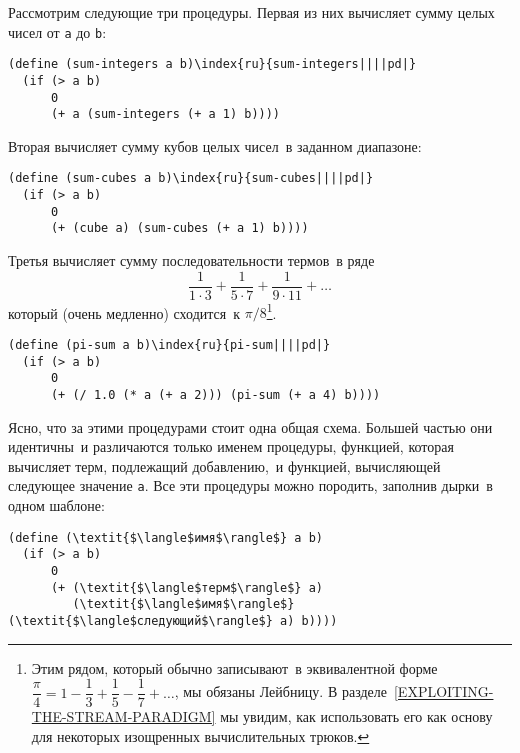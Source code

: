 Рассмотрим
следующие три процедуры.  Первая из них 
вычисляет сумму целых чисел от {\tt a} до {\tt b}:

\begin{Verbatim}[fontsize=\small]
(define (sum-integers a b)\index{ru}{sum-integers||||pd|}
  (if (> a b)
      0
      (+ a (sum-integers (+ a 1) b))))
\end{Verbatim}
Вторая вычисляет сумму кубов целых чисел~в заданном диапазоне:

\begin{Verbatim}[fontsize=\small]
(define (sum-cubes a b)\index{ru}{sum-cubes||||pd|}
  (if (> a b)
      0
      (+ (cube a) (sum-cubes (+ a 1) b))))
\end{Verbatim}
Третья вычисляет сумму последовательности термов~в ряде
$$
\dfrac{1}{1 \cdot 3} + \dfrac{1}{5 \cdot 7} + \dfrac{1}{9 \cdot 11} + \ldots
$$
который (очень медленно) сходится~к $\pi / 8$\footnote{
Этим рядом, который обычно записывают~в эквивалентной форме
$\dfrac{\pi}{4} = 1 - \dfrac{1}{3} + \dfrac{1}{5} - \dfrac{1}{7} +
\ldots$, мы обязаны  Лейбницу.
В разделе~\ref{EXPLOITING-THE-STREAM-PARADIGM} мы увидим,
как использовать его как основу для некоторых изощренных
вычислительных трюков.}.

\begin{Verbatim}[fontsize=\small]
(define (pi-sum a b)\index{ru}{pi-sum||||pd|}
  (if (> a b)
      0
      (+ (/ 1.0 (* a (+ a 2))) (pi-sum (+ a 4) b))))
\end{Verbatim}
Ясно, что за этими процедурами стоит одна общая схема.  Большей частью 
они идентичны~и различаются только именем процедуры, функцией, которая 
вычисляет терм, подлежащий добавлению,~и функцией, вычисляющей
следующее значение {\tt a}.  Все эти процедуры можно породить,
заполнив дырки~в одном шаблоне:

\begin{Verbatim}[fontsize=\small]
(define (\textit{$\langle$имя$\rangle$} a b)
  (if (> a b)
      0
      (+ (\textit{$\langle$терм$\rangle$} a)
         (\textit{$\langle$имя$\rangle$} (\textit{$\langle$следующий$\rangle$} a) b))))
\end{Verbatim}

